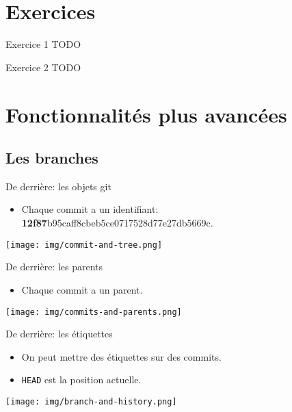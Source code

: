 \documentclass{beamer}
\begin{document}
\section{Exercices}

\begin{frame}{Exercice 1}
    TODO
\end{frame}

\begin{frame}{Exercice 2}
    TODO
\end{frame}


\section{Fonctionnalités plus avancées}

\subsection{Les branches}

\begin{frame}{De derrière: les objets git}
    \begin{itemize}
        \item Chaque commit a un identifiant: \textbf{12f87}b95caff8cbeb5ce0717528d77e27db5669c.
    \end{itemize}
    \begin{center}
    \texttt{[image: img/commit-and-tree.png]}
    \end{center}
\end{frame}

\begin{frame}{De derrière: les parents}
    \begin{itemize}
        \item Chaque commit a un parent.
    \end{itemize}
    \texttt{[image: img/commits-and-parents.png]}
\end{frame}

\begin{frame}{De derrière: les étiquettes}
    \begin{itemize}
        \item On peut mettre des étiquettes sur des commits.
        \item \texttt{HEAD} est la position actuelle.
    \end{itemize}
    \texttt{[image: img/branch-and-history.png]}
\end{frame}
\end{document}

